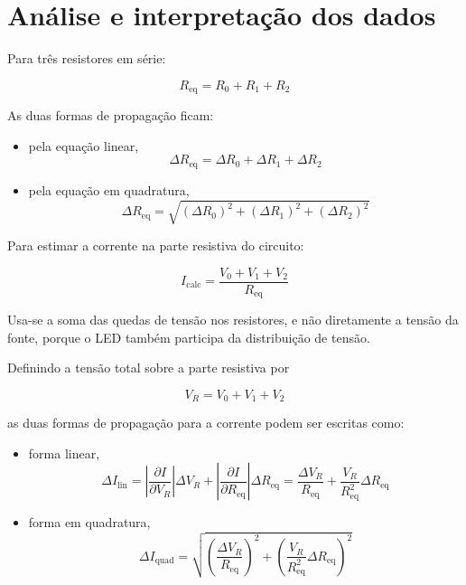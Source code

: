 \documentclass[12pt,a4paper]{article}
\begin{document}
\section{Análise e interpretação dos dados}

Para três resistores em série:

\begin{equation}
R_{\mathrm{eq}} = R_0 + R_1 + R_2
\end{equation}

As duas formas de propagação ficam:

\begin{itemize}
  \item pela equação linear,
  \begin{equation}
  \Delta R_{\mathrm{eq}} = \Delta R_0 + \Delta R_1 + \Delta R_2
  \end{equation}
  \item pela equação em quadratura,
  \begin{equation}
  \Delta R_{\mathrm{eq}} = \sqrt{(\Delta R_0)^2 + (\Delta R_1)^2 + (\Delta R_2)^2}
  \end{equation}
\end{itemize}

Para estimar a corrente na parte resistiva do circuito:

\begin{equation}
I_{\mathrm{calc}} = \frac{V_0 + V_1 + V_2}{R_{\mathrm{eq}}}
\end{equation}

Usa-se a soma das quedas de tensão nos resistores, e não diretamente a tensão da fonte, porque o LED também participa da
distribuição de tensão.

Definindo a tensão total sobre a parte resistiva por

\begin{equation}
V_R = V_0 + V_1 + V_2
\end{equation}

as duas formas de propagação para a corrente podem ser escritas como:

\begin{itemize}
  \item forma linear,
  \begin{equation}
  \Delta I_{\mathrm{lin}} =
  \left| \frac{\partial I}{\partial V_R} \right| \Delta V_R +
  \left| \frac{\partial I}{\partial R_{\mathrm{eq}}} \right| \Delta R_{\mathrm{eq}}
  =
  \frac{\Delta V_R}{R_{\mathrm{eq}}} + \frac{V_R}{R_{\mathrm{eq}}^2}\Delta R_{\mathrm{eq}}
  \end{equation}
  \item forma em quadratura,
  \begin{equation}
  \Delta I_{\mathrm{quad}} =
  \sqrt{
  \left(\frac{\Delta V_R}{R_{\mathrm{eq}}}\right)^2 +
  \left(\frac{V_R}{R_{\mathrm{eq}}^2}\Delta R_{\mathrm{eq}}\right)^2
  }
  \end{equation}
\end{itemize}
\end{document}
